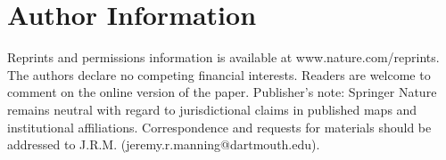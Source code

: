 \documentclass[11pt]{article}
\begin{document}
\section*{Author Information}
Reprints and permissions information is available at www.nature.com/reprints.  The authors declare no competing financial interests.  Readers are welcome to comment on the online version of the paper.  Publisher's note: Springer Nature remains neutral with regard to jurisdictional claims in published maps and institutional affiliations.  Correspondence and requests for materials should be addressed to J.R.M.  (jeremy.r.manning@dartmouth.edu).




\clearpage
\end{document}
